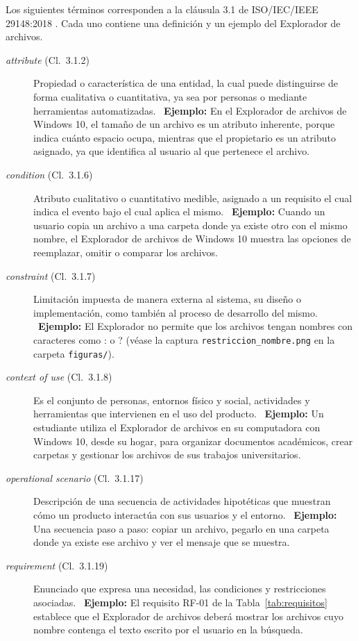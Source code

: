 \documentclass[10pt,a4paper]{article}
\begin{document}
Los siguientes términos corresponden a la cláusula 3.1 de ISO/IEC/IEEE 29148:2018 \cite{iso29148}. Cada uno contiene una definición y un ejemplo del Explorador de archivos.
{\small\setlength{\parskip}{0pt}\begin{description}
\item[\textit{attribute} (Cl.~3.1.2)] Propiedad o característica de una entidad, la cual puede distinguirse de forma cualitativa o cuantitativa, ya sea por personas o mediante herramientas automatizadas. \ \textbf{Ejemplo:} En el Explorador de archivos de Windows 10, el tamaño de un archivo es un atributo inherente, porque indica cuánto espacio ocupa, mientras que el propietario es un atributo asignado, ya que identifica al usuario al que pertenece el archivo.
\item[\textit{condition} (Cl.~3.1.6)] Atributo cualitativo o cuantitativo medible, asignado a un requisito el cual indica el evento bajo el cual aplica el mismo. \ \textbf{Ejemplo:} Cuando un usuario copia un archivo a una carpeta donde ya existe otro con el mismo nombre, el Explorador de archivos de Windows 10 muestra las opciones de reemplazar, omitir o comparar los archivos.
\item[\textit{constraint} (Cl.~3.1.7)] Limitación impuesta de manera externa al sistema, su diseño o implementación, como también al proceso de desarrollo del mismo. \ \textbf{Ejemplo:} El Explorador no permite que los archivos tengan nombres con caracteres como : o ? (véase la captura \texttt{restriccion\_nombre.png} en la carpeta \texttt{figuras/}).
\item[\textit{context of use} (Cl.~3.1.8)] Es el conjunto de personas, entornos físico y social, actividades y herramientas que intervienen en el uso del producto. \ \textbf{Ejemplo:} Un estudiante utiliza el Explorador de archivos en su computadora con Windows 10, desde su hogar, para organizar documentos académicos, crear carpetas y gestionar los archivos de sus trabajos universitarios.
\item[\textit{operational scenario} (Cl.~3.1.17)] Descripción de una secuencia de actividades hipotéticas que muestran cómo un producto interactúa con sus usuarios y el entorno. \ \textbf{Ejemplo:} Una secuencia paso a paso: copiar un archivo, pegarlo en una carpeta donde ya existe ese archivo y ver el mensaje que se muestra.
\item[\textit{requirement} (Cl.~3.1.19)] Enunciado que expresa una necesidad, las condiciones y restricciones asociadas. \ \textbf{Ejemplo:} El requisito RF-01 de la Tabla~\ref{tab:requisitos} establece que el Explorador de archivos deberá mostrar los archivos cuyo nombre contenga el texto escrito por el usuario en la búsqueda.

\end{description}}
\end{document}
